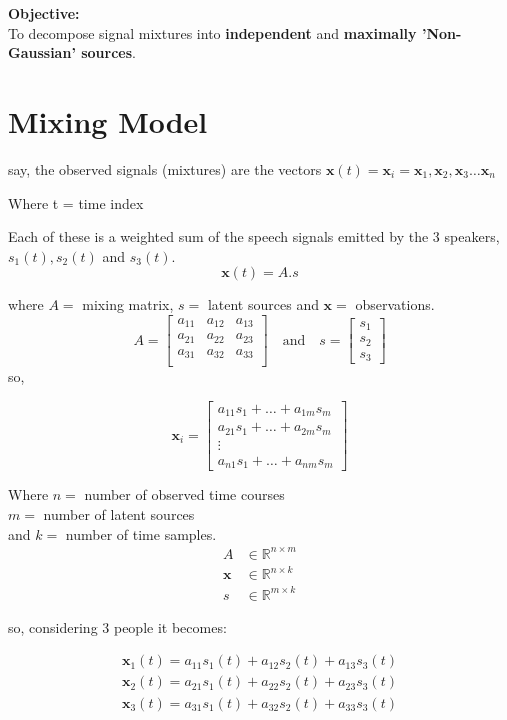 \documentclass[12pt]{article}
\newcommand{\x}{\bm{x}}
\numberwithin{equation}{section}
\begin{document}
\textbf{Objective:} \\
To decompose signal mixtures into \textbf{independent} and \textbf{maximally 'Non-Gaussian' sources}.

\section*{Mixing Model}
say, the observed signals (mixtures) are the vectors $\x(t) = \x_i = \x_1, \x_2, \x_3 \dots \x_n$

Where t = time index

Each of these is a weighted sum of the speech signals emitted by the 3 speakers, $s_1(t), s_2(t)$ and $s_3(t)$.
\[
\x(t) = A . s
\]

where $A =$ mixing matrix, $s =$ latent sources and $\x =$ observations. \[
A = \begin{bmatrix}
    a_{11} & a_{12} & a_{13} \\
    a_{21} & a_{22} & a_{23}\\
    a_{31} & a_{32} & a_{33}\\
\end{bmatrix}
\quad \text{and} \quad
s = \begin{bmatrix}
    s_1 \\
    s_2 \\
    s_3
\end{bmatrix}
\]
so,

\[\x_i = \begin{bmatrix}
a_{11}s_1 + \dots + a_{1m}s_m \\
a_{21}s_1 + \dots + a_{2m}s_m \\
\vdots \\
a_{n1}s_1 + \dots + a_{nm}s_m 
\end{bmatrix}
\]

Where $n =$ number of observed time courses \\
$m =$ number of latent sources \\
and $k =$ number of time samples. \\

\[
\begin{aligned}
A &\in \mathbb{R}^{n \times m} \\
\x &\in \mathbb{R}^{n \times k} \\
s &\in \mathbb{R}^{m \times k}
\end{aligned}
\]

so, considering 3 people it becomes: 

\begin{align*}
    \x_1(t) = a_{11} s_1(t) + a_{12} s_2(t) +a_{13}s_3(t)\\
    \x_2(t) = a_{21}s_1(t) + a_{22}s_2(t) + a_{23}s_3(t)\\
    \x_3(t) = a_{31}s_1(t) + a_{32}s_2(t) + a_{33}s_3(t)\\
\end{align*}
\end{document}
